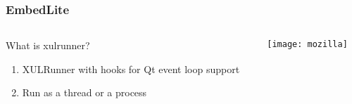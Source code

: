 \documentclass[
	notes=none,
	aspectratio=169
]{beamer}
\begin{document}

\begin{frame}
\frametitle{EmbedLite}

\begin{columns}[T]
\begin{column}[T]{0.5\textwidth}
\setlength{\parskip}{0.5em}

\vspace{1.5cm}
What is xulrunner?
\begin{enumerate}
\setlength{\parskip}{0.5em}
\item XULRunner with hooks for Qt event loop support
\item Run as a thread or a process
\end{enumerate}

\end{column}
\begin{column}[T]{0.5\textwidth}
\setlength{\parskip}{0.5em}

\vspace{0.5cm}
\texttt{[image: mozilla]}

\end{column}
\end{columns}

\end{frame}
\note{
\begin{enumerate}
\item -
\end{enumerate}
}

\end{document}
